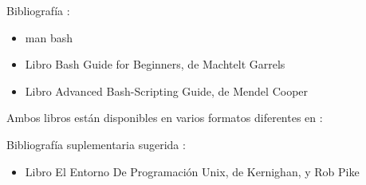 \documentclass{beamer}
\begin{document}
\begin{frame}
Bibliografía : 
\begin{itemize}
\item man bash
\item Libro Bash Guide for Beginners, de Machtelt Garrels 
\item Libro Advanced Bash-Scripting Guide, de Mendel Cooper
\end{itemize}

Ambos libros están disponibles en varios formatos diferentes en :

Bibliografía suplementaria sugerida : 
\begin{itemize}
\item Libro El Entorno De Programación Unix, de Kernighan, y Rob Pike
\end{itemize}

\end{frame}
\end{document}
